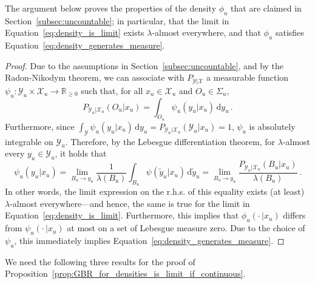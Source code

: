 \documentclass[twoside,11pt]{article}
\newcommand{\reals}{\mathbb{R}}
\newcommand{\realsnonneg}{\reals_{\geq 0}}
\newcommand{\states}{\mathcal{X}}
\newcommand{\observs}{\mathcal{Y}}
\begin{document}
The argument below proves the properties of the density $\phi_u$ that are claimed in Section~\ref{subsec:uncountable}; in particular, that the limit in Equation~\eqref{eq:density_is_limit} exists $\lambda$-almost everywhere, and that $\phi_u$ satisfies Equation~\eqref{eq:density_generates_measure}.
\begin{proof}
Due to the assumptions in Section~\ref{subsec:uncountable}, and by the Radon-Nikodym theorem, we can associate with $P_{\observs\vert\states}$ a measurable function $\psi_u:\observs_u\times\states_u\to\realsnonneg$ such that, for all $x_u\in\states_u$ and $O_u\in\Sigma_u$,
\begin{equation*}
P_{\observs_u\vert\states_u}(O_u\vert x_u) = \int_{O_u}\psi_u(y_u\vert x_u) \,\mathrm{d}y_u\,.
\end{equation*}
Furthermore, since $\int_{\observs}\psi_u(y_u\vert x_u) \,\mathrm{d}y_u = P_{\observs_u\vert\states_u}(\observs_u\vert x_u)=1$, $\psi_u$ is absolutely integrable on $\observs_u$. Therefore, by the Lebesgue differentiation theorem, for $\lambda$-almost every $y_u\in\observs_u$, it holds that
\begin{equation*}
\psi_u(y_u\vert x_u) = \lim_{B_u\to y_u} \frac{1}{\lambda(B_u)} \int_{B_u} \psi(\tilde{y}_u\vert x_u)\,\mathrm{d}\tilde{y}_u = \lim_{B_u\to y_u} \frac{P_{\observs_u\vert\states_u}(B_u\vert x_u)}{\lambda(B_u)}\,.
\end{equation*}
In other words, the limit expression on the r.h.s. of this equality exists (at least) $\lambda$-almost everywhere---and hence, the same is true for the limit in Equation~\eqref{eq:density_is_limit}. Furthermore, this implies that $\phi_u(\cdot\,\vert x_u)$ differs from $\psi_u(\cdot\,\vert x_u)$ at most on a set of Lebesgue measure zero. Due to the choice of $\psi_u$, this immediately implies Equation~\eqref{eq:density_generates_measure}.
\end{proof}


We need the following three results for the proof of Proposition~\ref{prop:GBR_for_densities_is_limit_if_continuous}.
\end{document}
